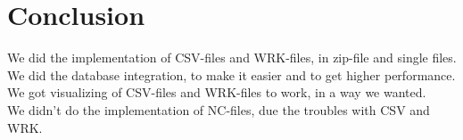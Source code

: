 \chapter{Conclusion}
We did the implementation of CSV-files and WRK-files, in zip-file and single files.\\
We did the database integration, to make it easier and to get higher performance.\\
We got visualizing of CSV-files and WRK-files to work, in a way we wanted.\\
We didn't do the implementation of NC-files, due the troubles with CSV and WRK.\\
